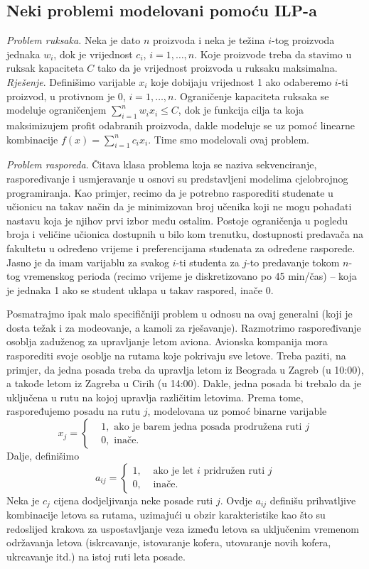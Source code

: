 \documentclass[a4paper, utf8, 11pt, colorlinks]{article}
\begin{document}
\subsection{Neki problemi modelovani pomoću ILP-a}

\emph{Problem ruksaka.} Neka je dato $n$ proizvoda i neka je težina $i$-tog proizvoda jednaka $w_i$, dok je vrijednost $c_i$, $i=1,\ldots,n$. Koje proizvode treba da stavimo u ruksak kapaciteta $C$ tako da je vrijednost proizvoda u ruksaku maksimalna. \\
\emph{Rješenje}. Definišimo varijable $x_i$ koje dobijaju vrijednost 1 ako odaberemo $i$-ti proizvod, u protivnom je 0, $i=1,\ldots,n$. Ograničenje kapaciteta ruksaka se modeluje ograničenjem $\sum_{i=1}^n w_i x_i \leq C$, dok je funkcija cilja ta koja maksimizujem profit odabranih proizvoda, dakle modeluje se uz pomoć linearne kombinacije $f(x) = \sum_{i=1}^n c_i x_i$. Time smo modelovali ovaj problem.

\emph{Problem rasporeda}. Čitava klasa problema koja se naziva sekvenciranje, raspoređivanje i usmjeravanje u osnovi su predstavljeni modelima cjelobrojnog programiranja. Kao primjer, recimo da je potrebno rasporediti studenate u  učionicu na takav način
da je minimizovan broj učenika koji ne mogu pohađati nastavu koja je njihov prvi izbor među ostalim. Postoje ograničenja u pogledu broja i veličine učionica dostupnih u bilo kom trenutku, dostupnosti predavača na fakultetu u određeno vrijeme i preferencijama studenata za određene rasporede. Jasno je da imam varijablu za svakog $i$-ti studenta 
za $j$-to predavanje tokom $n$-tog vremenskog perioda (recimo vrijeme je diskretizovano po 45 min/čas) -- koja je jednaka 1 ako se student uklapa u takav raspored, inače 0. 

Posmatrajmo ipak malo specifičniji problem u odnosu na ovaj generalni (koji je dosta težak i za modeovanje, a kamoli za rješavanje). 
Razmotrimo raspoređivanje osoblja zaduženog za upravljanje letom aviona. 
Avionska kompanija mora rasporediti svoje osoblje na rutama koje pokrivaju sve letove. Treba paziti, na primjer, da jedna posada treba da upravlja letom iz  Beograda u Zagreb (u 10:00), a takođe letom iz Zagreba u Cirih (u 14:00). Dakle, jedna posada bi trebalo da je uključena u rutu na kojoj upravlja različitim letovima. Prema tome, raspoređujemo posadu na rutu $j$, modelovana uz pomoć binarne varijable 
$$x_j = \begin{cases}
    &1, \mbox{ ako je barem jedna posada prodružena ruti } j \\
    &0, \mbox{ inače}. 
\end{cases}
$$
Dalje, definišimo 
$$a_{ij}= \begin{cases}
             1,& \mbox{ ako je let } i \mbox{ pridružen ruti } j \\
             0,& \mbox{ inače}.
        \end{cases}
$$
Neka je $c_j$ cijena dodjeljivanja neke posade ruti $j$. Ovdje $a_{ij}$ definišu prihvatljive kombinacije letova sa rutama, uzimajući u obzir  karakteristike kao što su redoslijed krakova za uspostavljanje veza između letova sa uključenim vremenom  održavanja letova (iskrcavanje, istovaranje kofera, utovaranje novih kofera, ukrcavanje itd.) na istoj ruti leta posade.   
\end{document}
